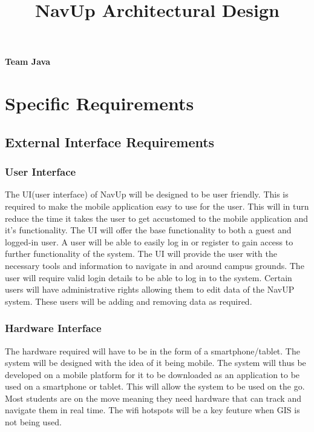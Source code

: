 \documentclass{article}
\begin{document}
\title{NavUp Architectural Design}
\maketitle
		\begin{center}
			\textbf{\newline Team Java} \\
		\end{center}
			
				
		\begin{flushright} \large
		\end{flushright}
\clearpage
\tableofcontents
	
\clearpage
\section{Specific Requirements}
	\subsection{External Interface Requirements}
		\subsubsection{User Interface}
The UI(user interface) of NavUp will be designed to be user friendly. This is required to make the mobile application easy to use for the user. This will in turn reduce the time it takes the user to get accustomed to the mobile application and it's functionality. The UI will offer the base functionality to both a guest and logged-in user. A user will be able to easily log in or register to gain access to further functionality of the system. The UI will provide the user with the necessary tools and information to navigate in and around campus grounds. The user will require valid login details to be able to log in to the system. Certain users will have administrative rights allowing them to edit data of the NavUP system. These users will be adding and removing data as required.

		\subsubsection{Hardware Interface}
The hardware required will have to be in the form of a smartphone/tablet. The system will be designed with the idea of it being mobile. The system will thus be developed on a mobile platform for it to be downloaded as an application to be used on a smartphone or tablet. This will allow the system to be used on the go. Most students are on the move meaning they need hardware that can track and navigate them in real time. The wifi hotspots will be a key feuture when GIS is not being used.
\end{document}
